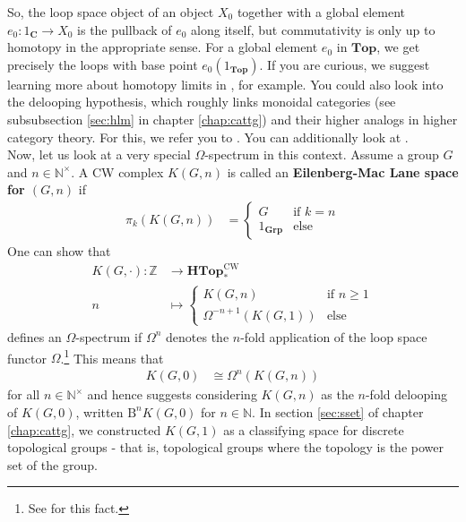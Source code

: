 So, the loop space object of an object $X_{0}$ together with a global element $e_{0} \colon 1_{\mathbf{C}} \rightarrow X_{0}$ is the pullback of $e_{0}$ along itself, but commutativity is only up to homotopy in the appropriate sense.
For a global element $e_{0}$ in $\mathbf{Top}$, we get precisely the loops with base point $e_{0}(1_{\mathbf{Top}})$.
If you are curious, we suggest learning more about homotopy limits in \cite{7a40623d}, for example.
You could also look into the delooping hypothesis, which roughly links monoidal categories (see subsubsection \ref{sec:hlm} in chapter \ref{chap:cattg}) and their higher analogs in higher category theory.
For this, we refer you to \cite{00000011}.
You can additionally look at \cite{66edf75b}.
\\
Now, let us look at a very special $\Omega$-spectrum in this context.
Assume a group $G$ and $n \in \mathbb{N}^{\times}$.
A CW complex $K(G,n)$ is called an \textbf{Eilenberg-Mac Lane space for $(G,n)$} if
\begin{align*}
  \pi_{k}(K(G,n))
  &=
  \begin{cases}
    G
    &
    \text{if }
    k
    =
    n
    \\
    1_{\mathbf{Grp}}
    &
    \text{else}
  \end{cases}
\end{align*}
One can show that
\begin{align*}
  K(G,\cdot)
  \colon
  \mathbb{Z}
  &\rightarrow
  \mathbf{HTop}_{\ast}^{\textrm{CW}}
  \\
  n
  &\mapsto
  \begin{cases}
    K(G,n)
    &
    \text{if }
    n
    \geq
    1
    \\
    \Omega^{-n+1}(K(G,1))
    &
    \text{else}
  \end{cases}
\end{align*}
defines an $\Omega$-spectrum if $\Omega^{n}$ denotes the $n$-fold application of the loop space functor $\Omega$.\footnote{See \cite{8b5861fc} for this fact.} This means that
\begin{align*}
  K(G,0)
  &\cong
  \Omega^{n}(K(G,n))
\end{align*}
for all $n \in \mathbb{N}^{\times}$ and hence suggests considering $K(G,n)$ as the $n$-fold delooping of $K(G,0)$, written $\mathrm{B}^{n}K(G,0)$ for $n \in \mathbb{N}$.
In section \ref{sec:sset} of chapter \ref{chap:cattg}, we constructed $K(G,1)$ as a classifying space for discrete topological groups - that is, topological groups where the topology is the power set of the group.
